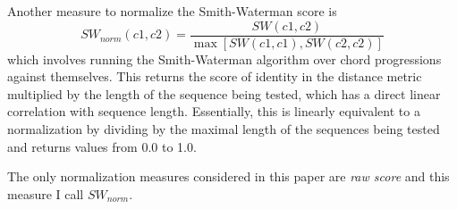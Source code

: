 Another measure to normalize the Smith-Waterman score is
\[ SW_{norm}(c1,c2)=\frac{SW(c1,c2)}{\max [SW(c1,c1), SW(c2,c2)]} \]
which involves running the Smith-Waterman algorithm over chord progressions against themselves. This returns the score of identity in the distance metric multiplied by the length of the sequence being tested, which has a direct linear correlation with sequence length. Essentially, this is linearly equivalent to a normalization by dividing by the maximal length of the sequences being tested and returns values from 0.0 to 1.0.

The only normalization measures considered in this paper are \textit{raw score} and this measure I call $SW_{norm}$.












